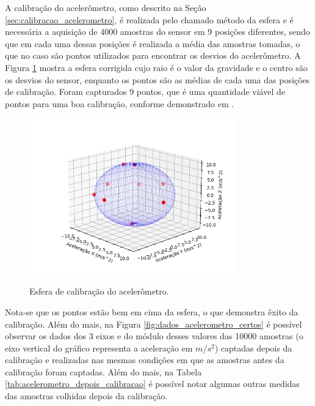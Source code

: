 \documentclass[acronym, symbols, table, deposito]{fei}
\begin{document}
	A calibração do acelerômetro, como descrito na Seção \ref{sec:calibracao_acelerometro}, é realizada pelo chamado método da esfera e é necessária a aquisição de 4000 amostras do sensor em 9 posições diferentes, sendo que em cada uma dessas posições é realizada a média das amostras tomadas, o que no caso são pontos utilizados para encontrar os desvios do acelerômetro. A Figura \ref{fig:dados_esfera_certo} mostra a esfera corrigida cujo raio é o valor da gravidade e o centro são os desvios do sensor, enquanto os pontos são as médias de cada uma das posições de calibração. Foram capturados 9 pontos, que é uma quantidade viável de pontos para uma boa calibração, conforme demonstrado em \textcite{menezes2020triaxial}.
	
	\begin{figure}[!htb]
		\centering
		\caption{Esfera de calibração do acelerômetro.}
		\includegraphics[width=0.8\textwidth]{dados_esfera_correto.png}
		\label{fig:dados_esfera_certo}
	\end{figure}
	
	Nota-se que os pontos estão bem em cima da esfera, o que demonstra êxito da calibração. Além do mais, na Figura \ref{fig:dados_acelerometro_certos} é possível observar os dados dos 3 eixos e do módulo desses valores das 10000 amostras (o eixo vertical do gráfico representa a aceleração em $m/s^2$) captadas depois da calibração e realizadas nas mesmas condições em que as amostras antes da calibração foram captadas. Além do mais, na Tabela \ref{tab:acelerometro_depois_calibracao} é possível notar algumas outras medidas das amostras colhidas depois da calibração.
	
\end{document}

